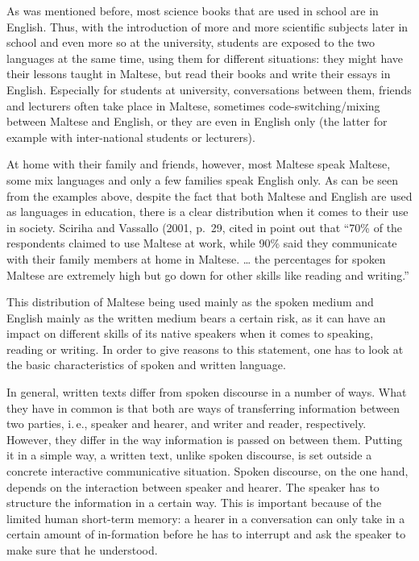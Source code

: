 \begin{multicols}{2}
As was mentioned before, most science books that are used in school are in English. Thus, with the introduction of more and more scientific subjects later in school and even more so at the university, students are exposed to the two languages at the same time, using them for different situations: they might have their lessons taught in Maltese, but read their books and write their essays in English. Especially for students at university, conversations between them, friends and lecturers often take place in Maltese, sometimes code-switching/mixing between Maltese and English, or they are even in English only (the latter for example with inter-national students or lecturers).

At home with their family and friends, however, most Maltese speak Maltese, some mix languages and only a few families speak English only. 
%
As can be seen from the examples above, despite the fact that both Maltese and English are used as languages in education, there is a clear distribution when it comes to their use in society. Sciriha and Vassallo (2001, p.~29, cited in \cite{Fabri:2011a} point out that ``70\% of the respondents claimed to use Maltese at work, while 90\% said they communicate with their family members at home in Maltese. … the percentages for spoken Maltese are extremely high but go down for other skills like reading and writing.''

This distribution of Maltese being used mainly as the spoken medium and English mainly as the written medium bears a certain risk, as it can have an impact on different skills of its native speakers when it comes to speaking, reading or writing. In order to give reasons to this statement, one has to look at the basic characteristics of spoken and written language.

In general, written texts differ from spoken discourse in a number of ways. What they have in common is that both are ways of transferring information between two parties, i.\,e., speaker and hearer, and writer and reader, respectively. However, they differ in the way information is passed on between them. Putting it in a simple way, a written text, unlike spoken discourse, is set outside a concrete interactive communicative situation. Spoken discourse, on the one hand, depends on the interaction between speaker and hearer. The speaker has to structure the information in a certain way. This is important because of the limited human short-term memory: a hearer in a conversation can only take in a certain amount of in-formation before he has to interrupt and ask the speaker to make sure that he understood. 


\end{multicols}
